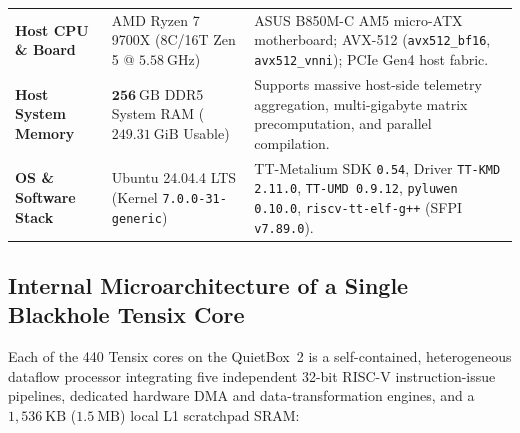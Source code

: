 \documentclass[10pt]{article}
\begin{document}
\begin{table}[!htbp]
\begin{tabularx}{\textwidth}{@{}l L{4.6cm} X@{}}
\addlinespace[3pt]
\textbf{Host CPU \& Board} & AMD Ryzen 7 9700X (8C/16T Zen 5 @ $5.58\ \mathrm{GHz}$) & ASUS B850M-C AM5 micro-ATX motherboard; AVX-512 (\texttt{avx512\_bf16}, \texttt{avx512\_vnni}); PCIe Gen4 host fabric. \\
\addlinespace[3pt]
\textbf{Host System Memory} & $\mathbf{256\ \mathrm{GB}}$ DDR5 System RAM ($249.31\ \mathrm{GiB}$ Usable) & Supports massive host-side telemetry aggregation, multi-gigabyte matrix precomputation, and parallel compilation. \\
\addlinespace[3pt]
\textbf{OS \& Software Stack} & Ubuntu 24.04.4 LTS (Kernel \texttt{7.0.0-31-generic}) & TT-Metalium SDK \texttt{0.54}, Driver \texttt{TT-KMD 2.11.0}, \texttt{TT-UMD 0.9.12}, \texttt{pyluwen 0.10.0}, \texttt{riscv-tt-elf-g++} (SFPI \texttt{v7.89.0}). \\
\bottomrule
\end{tabularx}
\end{table}

\subsection{Internal Microarchitecture of a Single Blackhole Tensix Core}

Each of the 440 Tensix cores on the QuietBox~2 is a self-contained, heterogeneous dataflow processor integrating five independent 32-bit RISC-V instruction-issue pipelines, dedicated hardware DMA and data-transformation engines, and a $1,536\ \mathrm{KB}$ ($1.5\ \mathrm{MB}$) local L1 scratchpad SRAM:
\end{document}
